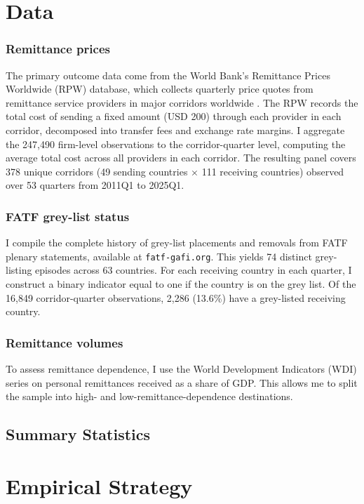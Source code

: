 \documentclass[12pt]{article}
\begin{document}
\section{Data}

\subsubsection*{Remittance prices} The primary outcome data come from the World Bank's Remittance Prices Worldwide (RPW) database, which collects quarterly price quotes from remittance service providers in major corridors worldwide \citep{worldbank2024}. The RPW records the total cost of sending a fixed amount (USD 200) through each provider in each corridor, decomposed into transfer fees and exchange rate margins. I aggregate the 247,490 firm-level observations to the corridor-quarter level, computing the average total cost across all providers in each corridor. The resulting panel covers 378 unique corridors (49 sending countries $\times$ 111 receiving countries) observed over 53 quarters from 2011Q1 to 2025Q1.

\subsubsection*{FATF grey-list status} I compile the complete history of grey-list placements and removals from FATF plenary statements, available at \texttt{fatf-gafi.org}. This yields 74 distinct grey-listing episodes across 63 countries. For each receiving country in each quarter, I construct a binary indicator equal to one if the country is on the grey list. Of the 16,849 corridor-quarter observations, 2,286 (13.6\%) have a grey-listed receiving country.

\subsubsection*{Remittance volumes} To assess remittance dependence, I use the World Development Indicators (WDI) series on personal remittances received as a share of GDP. This allows me to split the sample into high- and low-remittance-dependence destinations.

\subsection{Summary Statistics}




\section{Empirical Strategy}
\end{document}

